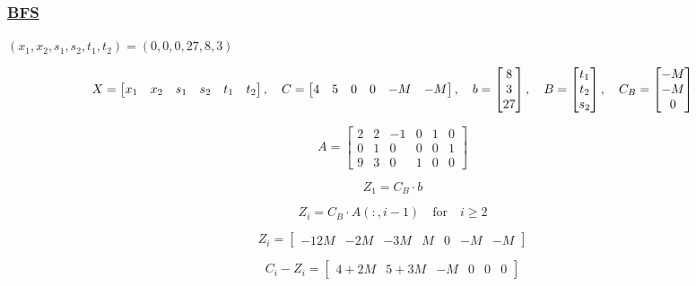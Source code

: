 \vspace{1cm}

\subsubsection*{\underline{BFS}}
\((x_1,x_2,s_1,s_2,t_1,t_2) = (0,0,0,27,8,3)\)

\[
X = \left[\begin{matrix} x_1 & x_2 & s_1 & s_2 & t_1 & t_2 \end{matrix}\right], \hspace{0.35cm}
C = \left[\begin{matrix} 4 & 5 & 0 & 0 & -M & -M \end{matrix}\right], \hspace{0.35cm}
b = \left[\begin{matrix} 8 \\ 3 \\ 27 \end{matrix}\right], \hspace{0.35cm}
B = \left[\begin{matrix} t_1 \\ t_2 \\ s_2 \end{matrix}\right], \hspace{0.35cm}
C_B = \left[\begin{matrix} -M \\ -M \\ 0 \end{matrix}\right]
\]


\vspace{0.5cm}
\[
    A = \left[\begin{matrix} 2 & 2 & -1 & 0 & 1 & 0\\
                             0 & 1 & 0 & 0 & 0 & 1\\
                             9 & 3 & 0 & 1 & 0 & 0\end{matrix}\right]
\]


\newpage
\[Z_1 = C_B \cdot b\] 


\[Z_i = C_B \cdot A(:, i-1) \quad \text{for} \quad i \geq 2\] 

\[Z_i =  \left[\begin{matrix} -12M & -2M & -3M & M & 0 & -M & -M \end{matrix}\right]\]

\vspace{0.5cm}

\[C_i-Z_i = \left[\begin{matrix} 4 + 2M & 5 + 3M & - M & 0 & 0 & 0 \end{matrix}\right]\]


